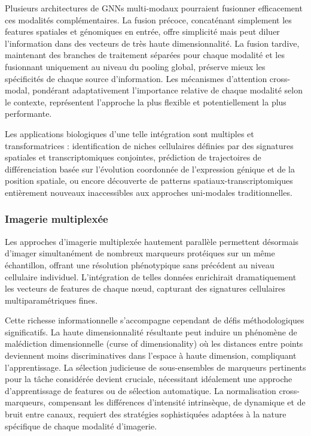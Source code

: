 Plusieurs architectures de GNNs multi-modaux pourraient fusionner efficacement ces modalités complémentaires. La fusion précoce, concaténant simplement les features spatiales et génomiques en entrée, offre simplicité mais peut diluer l'information dans des vecteurs de très haute dimensionnalité. La fusion tardive, maintenant des branches de traitement séparées pour chaque modalité et les fusionnant uniquement au niveau du pooling global, préserve mieux les spécificités de chaque source d'information. Les mécanismes d'attention cross-modal, pondérant adaptativement l'importance relative de chaque modalité selon le contexte, représentent l'approche la plus flexible et potentiellement la plus performante.

Les applications biologiques d'une telle intégration sont multiples et transformatrices : identification de niches cellulaires définies par des signatures spatiales et transcriptomiques conjointes, prédiction de trajectoires de différenciation basée sur l'évolution coordonnée de l'expression génique et de la position spatiale, ou encore découverte de patterns spatiaux-transcriptomiques entièrement nouveaux inaccessibles aux approches uni-modales traditionnelles.

\subsubsection{Imagerie multiplexée}

Les approches d'imagerie multiplexée hautement parallèle permettent désormais d'imager simultanément de nombreux marqueurs protéiques sur un même échantillon, offrant une résolution phénotypique sans précédent au niveau cellulaire individuel. L'intégration de telles données enrichirait dramatiquement les vecteurs de features de chaque nœud, capturant des signatures cellulaires multiparamétriques fines.

Cette richesse informationnelle s'accompagne cependant de défis méthodologiques significatifs. La haute dimensionnalité résultante peut induire un phénomène de malédiction dimensionnelle (curse of dimensionality) où les distances entre points deviennent moins discriminatives dans l'espace à haute dimension, compliquant l'apprentissage. La sélection judicieuse de sous-ensembles de marqueurs pertinents pour la tâche considérée devient cruciale, nécessitant idéalement une approche d'apprentissage de features ou de sélection automatique. La normalisation cross-marqueurs, compensant les différences d'intensité intrinsèque, de dynamique et de bruit entre canaux, requiert des stratégies sophistiquées adaptées à la nature spécifique de chaque modalité d'imagerie.

